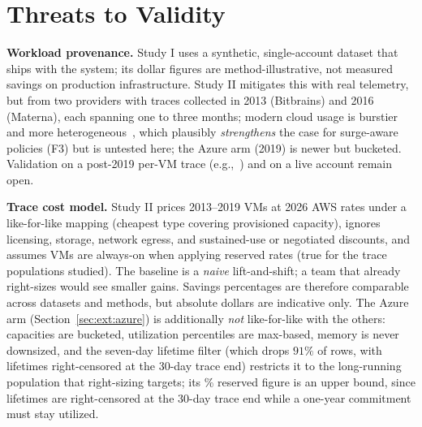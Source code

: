 \documentclass[10pt,journal]{IEEEtran}
\begin{document}
\section{Threats to Validity}\label{sec:threats}
\textbf{Workload provenance.} Study I uses a synthetic, single-account
dataset that ships with the system; its dollar figures are
method-illustrative, not measured savings on production infrastructure.
Study II mitigates this with real telemetry, but from two providers with
traces collected in 2013 (Bitbrains) and 2016 (Materna), each spanning one
to three months; modern cloud usage is burstier and more
heterogeneous~\cite{tirmazi2020borgng}, which plausibly \emph{strengthens}
the case for surge-aware policies (F3) but is untested here; the Azure arm
(2019) is newer but bucketed. Validation on a post-2019 per-VM trace
(e.g.,~\cite{uhlig2025sap}) and on a live account remain open.

\textbf{Trace cost model.} Study II prices 2013--2019 VMs at 2026 AWS rates
under a like-for-like mapping (cheapest type covering provisioned
capacity), ignores licensing, storage, network egress, and sustained-use or
negotiated discounts, and assumes VMs are always-on when applying reserved
rates (true for the trace populations studied). The baseline is a
\emph{naive} lift-and-shift; a team that already right-sizes would see
smaller gains. Savings percentages are therefore comparable across datasets
and methods, but absolute dollars are indicative only. The Azure arm
(Section~\ref{sec:ext:azure}) is additionally \emph{not} like-for-like with
the others: capacities are bucketed, utilization percentiles are max-based,
memory is never downsized, and the seven-day lifetime filter (which drops
$91\%$ of rows, with lifetimes right-censored at the 30-day trace end)
restricts it to the long-running population that right-sizing targets; its
\azSavingsPctRi\% reserved figure is an upper bound, since lifetimes are
right-censored at the 30-day trace end while a one-year commitment must
stay utilized.
\end{document}
